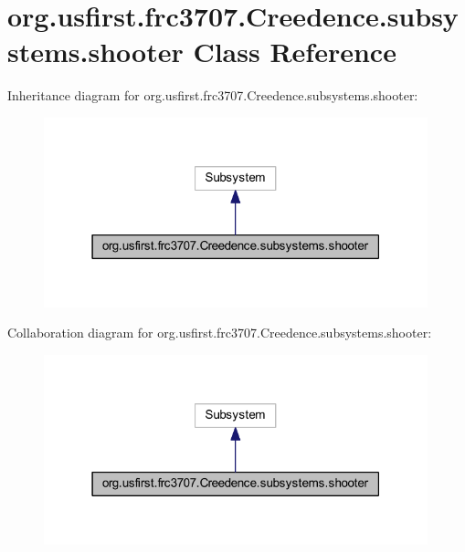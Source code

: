\hypertarget{classorg_1_1usfirst_1_1frc3707_1_1_creedence_1_1subsystems_1_1shooter}{}\section{org.\+usfirst.\+frc3707.\+Creedence.\+subsystems.\+shooter Class Reference}
\label{classorg_1_1usfirst_1_1frc3707_1_1_creedence_1_1subsystems_1_1shooter}


Inheritance diagram for org.\+usfirst.\+frc3707.\+Creedence.\+subsystems.\+shooter\+:
\nopagebreak
\begin{figure}[H]
\begin{center}
\leavevmode
\includegraphics[width=315pt]{classorg_1_1usfirst_1_1frc3707_1_1_creedence_1_1subsystems_1_1shooter__inherit__graph}
\end{center}
\end{figure}


Collaboration diagram for org.\+usfirst.\+frc3707.\+Creedence.\+subsystems.\+shooter\+:
\nopagebreak
\begin{figure}[H]
\begin{center}
\leavevmode
\includegraphics[width=315pt]{classorg_1_1usfirst_1_1frc3707_1_1_creedence_1_1subsystems_1_1shooter__coll__graph}
\end{center}
\end{figure}
